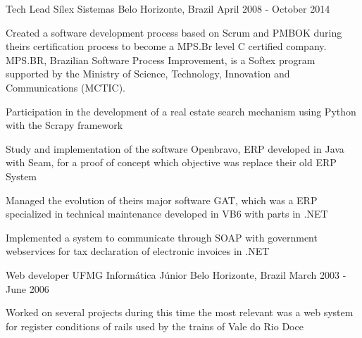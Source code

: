 \begin{cventries}
  \cventry
    {Tech Lead} %
    {Sílex Sistemas} %
    {Belo Horizonte, Brazil} %
    {April 2008 - October 2014} %
    {
      \begin{cvitems} %
        \item {Created a software development process based on Scrum and PMBOK during theirs certification process to become a MPS.Br level C certified company. MPS.BR, Brazilian Software Process Improvement, is a Softex program supported by the Ministry of Science, Technology, Innovation and Communications (MCTIC).}      
        \item {Participation in the development of a real estate search mechanism using Python with the Scrapy framework}              
        \item {Study and implementation of the software Openbravo, ERP developed in Java with Seam, for a proof of concept which objective was replace their old ERP System}      
        \item {Managed the evolution of theirs major software GAT, which was a ERP specialized in technical maintenance developed in VB6 with parts in .NET}
        \item {Implemented a system to communicate through SOAP  with government webservices for tax declaration of electronic invoices in .NET}
      \end{cvitems}
    }

  \cventry
    {Web developer} %
    {UFMG Informática Júnior} %
    {Belo Horizonte, Brazil} %
    {March 2003 - June 2006} %
    {
      \begin{cvitems} %
        \item {Worked on several projects during this time the most relevant was a web system for register conditions of rails used by the trains of Vale do Rio Doce}
      \end{cvitems}
    }

\end{cventries}
